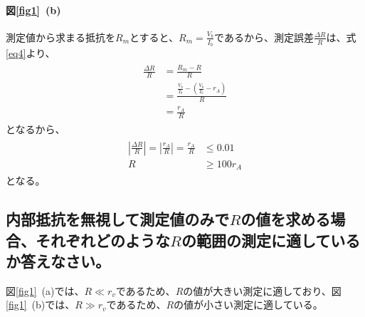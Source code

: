 \documentclass[a4paper,11pt]{jsarticle}
\begin{document}
\paragraph{図\ref{fig1}~(b)}
測定値から求まる抵抗を$R_{m}$とすると、$R_{m}=\frac{V_{b}}{I_{b}}$であるから、測定誤差$\frac{\Delta R}{R}$は、式\eqref{eq4}より、
\begin{align}
  \begin{split}
    \frac{\Delta R}{R}
    &=\frac{R_{m}-R}{R}\\
    &=\frac{\frac{V_{b}}{I_{b}}-\left(\frac{V_{b}}{I_{b}}-r_{A}\right)}{R}\\
    &=\frac{r_{A}}{R}
    \label{eq8}
  \end{split}
\end{align}
となるから、
\begin{align}
  \begin{split}
    \left|\frac{\Delta R}{R}\right|=\left|\frac{r_{A}}{R}\right|=\frac{r_{A}}{R}
    &\leq 0.01\\
    R
    &\geq 100r_{A}
    \label{eq9}
  \end{split}
\end{align}
となる。

\subsection{内部抵抗を無視して測定値のみで$R$の値を求める場合、それぞれどのような$R$の範囲の測定に適しているか答えなさい。}
図\ref{fig1}~(a)では、$R\ll r_{v}$であるため、$R$の値が大きい測定に適しており、図\ref{fig1}~(b)では、$R\gg r_{v}$であるため、$R$の値が小さい測定に適している。
\end{document}
